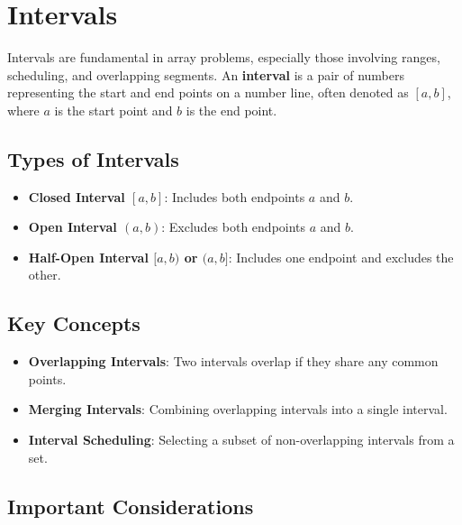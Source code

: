 
\section{Intervals}

Intervals are fundamental in array problems, especially those involving ranges, scheduling, and overlapping segments. An \textbf{interval} is a pair of numbers representing the start and end points on a number line, often denoted as \([a, b]\), where \(a\) is the start point and \(b\) is the end point.

\subsection{Types of Intervals}

\begin{itemize}
    \item \textbf{Closed Interval \([a, b]\)}: Includes both endpoints \(a\) and \(b\).
    \item \textbf{Open Interval \((a, b)\)}: Excludes both endpoints \(a\) and \(b\).
    \item \textbf{Half-Open Interval \([a, b)\) or \((a, b]\)}: Includes one endpoint and excludes the other.
\end{itemize}

\subsection{Key Concepts}

\begin{itemize}
    \item \textbf{Overlapping Intervals}: Two intervals overlap if they share any common points.
    \item \textbf{Merging Intervals}: Combining overlapping intervals into a single interval.
    \item \textbf{Interval Scheduling}: Selecting a subset of non-overlapping intervals from a set.
\end{itemize}

\subsection{Important Considerations}

